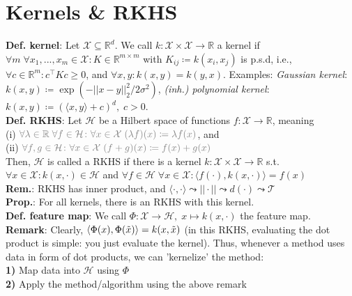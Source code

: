 \section{Kernels \& RKHS}
\textbf{Def. kernel}: Let $\mathcal{X} \subseteq \mathbb{R}^d$. We call $k \colon \mathcal{X} \times \mathcal{X} \to \mathbb{R}$ a kernel if $\forall m \; \forall x_1,...,x_m \in \mathcal{X} \colon K \in \mathbb{R}^{m\times m}$ with $K_{ij} \coloneqq k(x_i, x_j)$ is p.s.d, i.e., $\forall c \in \mathbb{R}^m \colon c^\intercal Kc \geq 0$, and $\forall x,y \colon k(x,y) = k(y,x)$. Examples: \emph{Gaussian kernel}: $k(x,y) \coloneqq \exp{\left(-||x-y||^2_2 / 2\sigma^2\right)}$, \emph{(inh.) polynomial kernel}: $k(x,y) \coloneqq \left( \langle x,y \rangle + c \right)^d, \; c > 0$. \\
\textbf{Def. RKHS}: Let $\mathcal{H}$ be a Hilbert space of functions $f \colon \mathcal{X} \to \mathbb{R}$, meaning\\
(i) $\mathcolor{gray}{\forall \lambda \in \mathbb{R} \; \forall f \in \mathcal{H} \colon \forall x \in \mathcal{X} \; (\lambda f)(x) \coloneqq \lambda f(x)}$, and  \\
(ii) $\mathcolor{gray}{\forall f, g \in \mathcal{H} \colon \forall x \in \mathcal{X} \; (f+g)(x) \coloneqq f(x) + g(x)}$ \\
Then, $\mathcal{H}$ is called a RKHS if there is a kernel $k\colon \mathcal{X} \times \mathcal{X} \to \mathbb{R}$ s.t. \\
$\forall x \in \mathcal{X} \colon k(x, \cdot) \in \mathcal{H}$ and $\forall f \in \mathcal{H} \; \forall x \in \mathcal{X} \colon \langle f(\cdot), k(x, \cdot) \rangle = f(x)$\\
\textbf{Rem.}: RKHS has inner product, and $\langle\cdot,\cdot\rangle \leadsto ||\cdot|| \leadsto d(\cdot) \leadsto \mathcal{T}$ \\
\textbf{Prop.}: For all kernels, there is an RKHS with this kernel. \\
\textbf{Def. feature map}: We call $\Phi \colon \mathcal{X} \to \mathcal{H}, \; x \mapsto k(x, \cdot)$ the feature map.\\
\textbf{Remark}: Clearly, $\langle \Phi(x), \Phi(\Tilde{x}) \rangle = k(x, \Tilde{x})$ (\textrightarrow in this RKHS, evaluating the dot product is simple: you just evaluate the kernel). Thus, whenever a method uses data in form of dot products, we can 'kernelize' the method: \\
\textbf{1)} Map data into $\mathcal{H}$ using $\Phi$ \\
\textbf{2)} Apply the method/algorithm using the above remark

